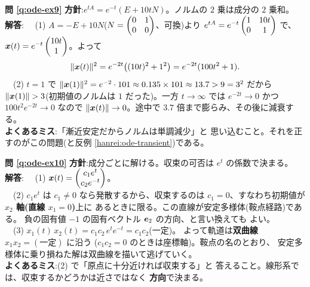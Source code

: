\bigskip
\noindent\textbf{問 \ref{q:ode-ex9}}\quad
\textbf{方針}:$e^{tA} = e^{-t}(E + 10tN)$。ノルムの $2$ 乗は成分の
$2$ 乗和。\\
\textbf{解答}:
　(1) $A = -E + 10N$($N = \begin{pmatrix}0 & 1 \\ 0 & 0\end{pmatrix}$、可換)より
$e^{tA} = e^{-t}\begin{pmatrix}1 & 10t \\ 0 & 1\end{pmatrix}$ で、
$\bm{x}(t) = e^{-t}\begin{pmatrix}10t \\ 1\end{pmatrix}$。よって
\[
\|\bm{x}(t)\|^2 = e^{-2t}\bigl((10t)^2 + 1^2\bigr) = e^{-2t}(100t^2 + 1).
\]
　(2) $t = 1$ で $\|\bm{x}(1)\|^2 = e^{-2} \cdot 101 \approx
0.135 \times 101 \approx 13.7 > 9 = 3^2$ だから
$\|\bm{x}(1)\| > 3$(初期値のノルムは $1$ だった)。一方
$t \to \infty$ では $e^{-2t} \to 0$ かつ $100t^2 e^{-2t} \to 0$ なので
$\|\bm{x}(t)\| \to 0$。途中で $3.7$ 倍まで膨らみ、その後に減衰する。\\
\textbf{よくあるミス}:「漸近安定だからノルムは単調減少」と
思い込むこと。それを正すのがこの問題(と反例
\ref{hanrei:ode-transient})である。

\bigskip
\noindent\textbf{問 \ref{q:ode-ex10}}\quad
\textbf{方針}:成分ごとに解ける。収束の可否は $e^{t}$ の係数で決まる。\\
\textbf{解答}:
　(1) $\bm{x}(t) = \begin{pmatrix}c_1 e^{t} \\ c_2 e^{-t}\end{pmatrix}$。\\
　(2) $c_1 e^{t}$ は $c_1 \neq 0$ なら発散するから、収束するのは
$c_1 = 0$、すなわち初期値が\textbf{$x_2$ 軸(直線 $x_1 = 0$)}上に
あるときに限る。この直線が安定多様体(鞍点経路)である。
負の固有値 $-1$ の固有ベクトル $\bm{e}_2$ の方向、と言い換えても
よい。\\
　(3) $x_1(t)\,x_2(t) = c_1 c_2\,e^{t}e^{-t} = c_1 c_2$(一定)。
よって軌道は\textbf{双曲線 $x_1 x_2 = (\text{一定})$} に沿う
($c_1 c_2 = 0$ のときは座標軸)。鞍点の名のとおり、
安定多様体に乗り損ねた解は双曲線を描いて逃げていく。\\
\textbf{よくあるミス}:(2) で「原点に十分近ければ収束する」と
答えること。線形系では、収束するかどうかは近さではなく
\textbf{方向}で決まる。

